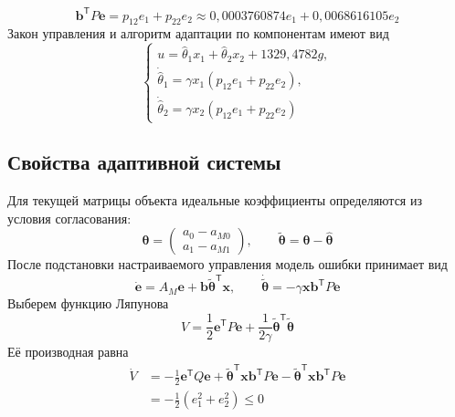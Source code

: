 \begin{equation}
  \bm b^{\mathsf T}P\bm e=p_{12}e_1+p_{22}e_2
  \approx0{,}0003760874e_1+0{,}0068616105e_2
\end{equation}
Закон управления и алгоритм адаптации по компонентам имеют вид
\begin{equation}
  \begin{cases}
    u=\hat\theta_1x_1+\hat\theta_2x_2+1329{,}4782g,\\
    \dot{\hat\theta}_1=\gamma x_1(p_{12}e_1+p_{22}e_2),\\
    \dot{\hat\theta}_2=\gamma x_2(p_{12}e_1+p_{22}e_2)
  \end{cases}
\end{equation}

\subsection{Свойства адаптивной системы}

Для текущей матрицы объекта идеальные коэффициенты определяются
из условия согласования:
\begin{equation}
  \bm\theta=\begin{pmatrix}a_0-a_{M0}\\a_1-a_{M1}\end{pmatrix},
  \qquad \tilde{\bm\theta}=\bm\theta-\hat{\bm\theta}
\end{equation}
После подстановки настраиваемого управления модель ошибки принимает вид
\begin{equation}
  \dot{\bm e}=A_M\bm e+\bm b\tilde{\bm\theta}^{\mathsf T}\bm x,
  \qquad
  \dot{\tilde{\bm\theta}}=-\gamma\bm x\bm b^{\mathsf T}P\bm e
\end{equation}
Выберем функцию Ляпунова
\begin{equation}
  V=\frac{1}{2}\bm e^{\mathsf T}P\bm e+
  \frac{1}{2\gamma}\tilde{\bm\theta}^{\mathsf T}\tilde{\bm\theta}
\end{equation}
Её производная равна
\begin{equation}
  \begin{aligned}
    \dot V&=-\frac{1}{2}\bm e^{\mathsf T}Q\bm e+
    \tilde{\bm\theta}^{\mathsf T}\bm x\bm b^{\mathsf T}P\bm e
    -\tilde{\bm\theta}^{\mathsf T}\bm x\bm b^{\mathsf T}P\bm e\\
    &=-\frac{1}{2}(e_1^2+e_2^2)\le0
  \end{aligned}
\end{equation}

